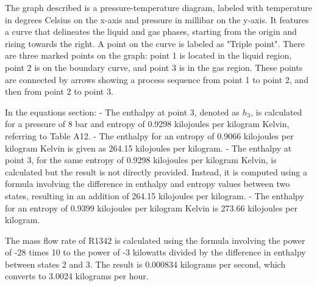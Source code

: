The graph described is a pressure-temperature diagram, labeled with temperature in degrees Celsius on the x-axis and pressure in millibar on the y-axis. It features a curve that delineates the liquid and gas phases, starting from the origin and rising towards the right. A point on the curve is labeled as "Triple point". There are three marked points on the graph: point 1 is located in the liquid region, point 2 is on the boundary curve, and point 3 is in the gas region. These points are connected by arrows showing a process sequence from point 1 to point 2, and then from point 2 to point 3.

In the equations section:
- The enthalpy at point 3, denoted as \( h_3 \), is calculated for a pressure of 8 bar and entropy of 0.9298 kilojoules per kilogram Kelvin, referring to Table A12.
- The enthalpy for an entropy of 0.9066 kilojoules per kilogram Kelvin is given as 264.15 kilojoules per kilogram.
- The enthalpy at point 3, for the same entropy of 0.9298 kilojoules per kilogram Kelvin, is calculated but the result is not directly provided. Instead, it is computed using a formula involving the difference in enthalpy and entropy values between two states, resulting in an addition of 264.15 kilojoules per kilogram.
- The enthalpy for an entropy of 0.9399 kilojoules per kilogram Kelvin is 273.66 kilojoules per kilogram.

The mass flow rate of R1342 is calculated using the formula involving the power of -28 times 10 to the power of -3 kilowatts divided by the difference in enthalpy between states 2 and 3. The result is 0.000834 kilograms per second, which converts to 3.0024 kilograms per hour.